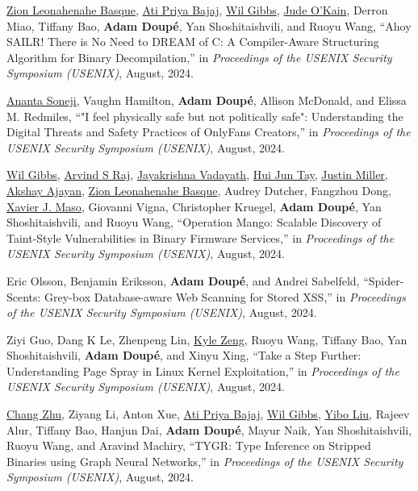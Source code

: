 \documentclass[11pt,letterpaper,sans]{moderncv}
\begin{document}
\begin{etaremune}
\item \underline{Zion Leonahenahe Basque}, \underline{Ati Priya Bajaj}, \underline{Wil Gibbs}, \underline{Jude O'Kain}, Derron Miao, Tiffany Bao, \textbf{Adam Doup\'e}, Yan Shoshitaishvili, and Ruoyu Wang, ``Ahoy SAILR! There is No Need to DREAM of C: A Compiler-Aware Structuring Algorithm for Binary Decompilation,'' in \emph{Proceedings of the USENIX Security Symposium (USENIX)}, August, 2024.

\item \underline{Ananta Soneji}, Vaughn Hamilton, \textbf{Adam Doup\'e}, Allison McDonald, and Elissa M. Redmiles, ``"I feel physically safe but not politically safe": Understanding the Digital Threats and Safety Practices of OnlyFans Creators,'' in \emph{Proceedings of the USENIX Security Symposium (USENIX)}, August, 2024.

\item \underline{Wil Gibbs}, \underline{Arvind S Raj}, \underline{Jayakrishna Vadayath}, \underline{Hui Jun Tay}, \underline{Justin Miller}, \underline{Akshay Ajayan}, \underline{Zion Leonahenahe Basque}, Audrey Dutcher, Fangzhou Dong, \underline{Xavier J. Maso}, Giovanni Vigna, Christopher Kruegel, \textbf{Adam Doup\'e}, Yan Shoshitaishvili, and Ruoyu Wang, ``Operation Mango: Scalable Discovery of Taint-Style Vulnerabilities in Binary Firmware Services,'' in \emph{Proceedings of the USENIX Security Symposium (USENIX)}, August, 2024.

\item Eric Olsson, Benjamin Eriksson, \textbf{Adam Doup\'e}, and Andrei Sabelfeld, ``Spider-Scents: Grey-box Database-aware Web Scanning for Stored XSS,'' in \emph{Proceedings of the USENIX Security Symposium (USENIX)}, August, 2024.

\item Ziyi Guo, Dang K Le, Zhenpeng Lin, \underline{Kyle Zeng}, Ruoyu Wang, Tiffany Bao, Yan Shoshitaishvili, \textbf{Adam Doup\'e}, and Xinyu Xing, ``Take a Step Further: Understanding Page Spray in Linux Kernel Exploitation,'' in \emph{Proceedings of the USENIX Security Symposium (USENIX)}, August, 2024.

\item \underline{Chang Zhu}, Ziyang Li, Anton Xue, \underline{Ati Priya Bajaj}, \underline{Wil Gibbs}, \underline{Yibo Liu}, Rajeev Alur, Tiffany Bao, Hanjun Dai, \textbf{Adam Doup\'e}, Mayur Naik, Yan Shoshitaishvili, Ruoyu Wang, and Aravind Machiry, ``TYGR: Type Inference on Stripped Binaries using Graph Neural Networks,'' in \emph{Proceedings of the USENIX Security Symposium (USENIX)}, August, 2024.


\end{etaremune}
\end{document}
